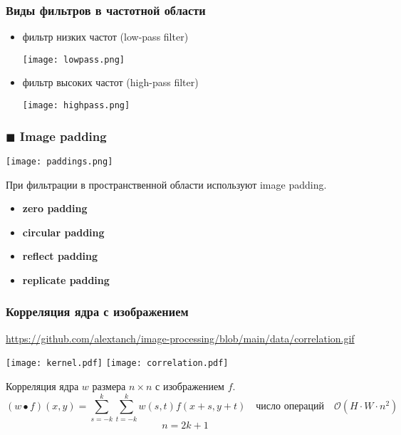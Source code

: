 \documentclass[
    12pt, 
    usepdftitle=false,
    aspectratio=1610
]{beamer}
\begin{document}
\begin{frame}
\frametitle{Виды фильтров в частотной области}
    \begin{itemize}
        \item фильтр низких частот (low-pass filter)
        \begin{center}
            \texttt{[image: lowpass.png]}
        \end{center}
        \item фильтр высоких частот (high-pass filter)
        \begin{center}
            \texttt{[image: highpass.png]}
        \end{center}
    \end{itemize}
\end{frame}

\begin{frame}
    \frametitle{$\blacksquare$ Image padding}
    \begin{center}
        \texttt{[image: paddings.png]}
    \end{center}
    При фильтрации в пространственной области используют image padding.
    \vspace{0.5cm}

    \begin{itemize}
        \item \textbf{zero padding}
        \item \textbf{circular padding}
        \item \textbf{reflect padding}
        \item \textbf{replicate padding}
    \end{itemize}
\end{frame}

\begin{frame}
    \frametitle{Корреляция ядра с изображением}
    \url{https://github.com/alextanch/image-processing/blob/main/data/correlation.gif}
    \begin{center}
        \texttt{[image: kernel.pdf]}
        \texttt{[image: correlation.pdf]}
    \end{center}
    Корреляция ядра $w$ размера $n\times n$ с изображением $f$.
    $$
        (w\bullet f)(x,y)=\sum_{s=-k}^k\sum_{t=-k}^k w(s,t)f(x+s,y+t)
        \quad\mbox{число операций}\quad
        \mathcal{O}\left(H\cdot W\cdot n^2\right)
    $$
    $$
        n=2k+1
    $$
\end{frame}
\end{document}
